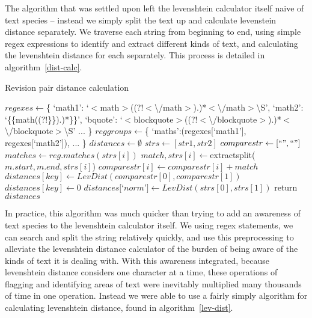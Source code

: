 The algorithm that was settled upon left the levenshtein calculator
itself naive of text species -- instead we simply split the text up
and calculate levenstein distance separately. We traverse each string
from beginning to end, using simple regex expressions to identify and
extract different kinds of text, and calculating the levenshtein
distance for each separately. This process is detailed in
algorithm~\ref{dist-calc}. 

\begin{algorithm}
  \caption{Revision pair distance calculation}\label{dist-calc}
  \begin{algorithmic}[5]
    \State $regexes \gets $\{
    \Statex \tab`math1': `$<$math$>$((?!$<${\textbackslash}/math$>$).)*$<${\textbackslash}/math$>${\textbackslash}S',
    \Statex \tab`math2': `\{\{math((?!\}\}).)*\}\}',
    \Statex \tab`bquote': `$<$blockquote$>$((?!$<${\textbackslash}/blockquote$>$).)*$<${\textbackslash}/blockquote$>${\textbackslash}S'
    \Statex  \tab...
    \Statex\}
    \State $reggroups \gets $\{\label{dist-calc-groups}
    \Statex  \tab`maths':(regexes[`math1'], regexes[`math2']),
    \Statex  \tab...
    \Statex \}
    \State $distances \gets \emptyset$
    \State $strs \gets [str1, str2]$
    \State $comparestr \gets [``", ``"]$
    \State $matches \gets reg.matches(strs[i])$
    \State $match, strs[i] \gets $extractsplit($m.start, m.end, strs[i]$)
    \State $comparestr[i] \gets comparestr[i] + match$
    \EndFor
    \EndFor
    \State $distances[key] \gets LevDist(comparestr[0], comparestr[1])$ \label{mprocess-spawn}
    \Else
    \State $distances[key] \gets 0$
    \EndIf
    \EndFor
    \State $distances[$`$norm$'$] \gets LevDist(strs[0], strs[1])$
    \State return $distances$\label{mprocess-return}
    \EndFunction
  \end{algorithmic}
\end{algorithm}

In practice, this algorithm was much quicker than trying to add an
awareness of text species to the levenshtein calculator itself. We
using regex statements, we can search and split the string relatively
quickly, and use this preprocessing to alleviate the levenshtein
distance calculator of the burden of being aware of the kinds of text
it is dealing with. With this awareness integrated, because
levenshtein distance considers one character at a time, these
operations of flagging and identifying areas of text were inevitably
multiplied many thousands of time in one operation. Instead we were
able to use a fairly simply algorithm for calculating levenshtein
distance, found in algorithm~\ref{lev-dist}.


